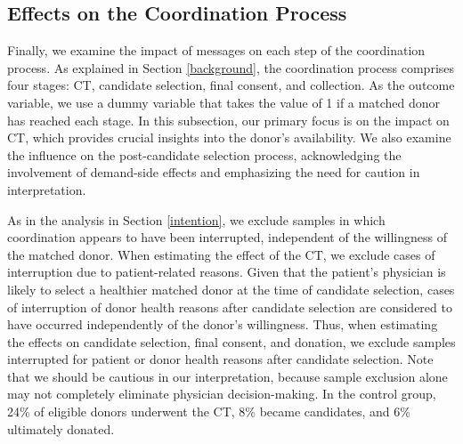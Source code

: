\documentclass[12pt, a4paper]{article}
\begin{document}
\hypertarget{process}{%
\subsection{Effects on the Coordination Process}\label{process}}

Finally, we examine the impact of messages on each step of the coordination process. As explained in Section \ref{background}, the coordination process comprises four stages: CT, candidate selection, final consent, and collection. As the outcome variable, we use a dummy variable that takes the value of 1 if a matched donor has reached each stage. In this subsection, our primary focus is on the impact on CT, which provides crucial insights into the donor's availability. We also examine the influence on the post-candidate selection process, acknowledging the involvement of demand-side effects and emphasizing the need for caution in interpretation.

As in the analysis in Section \ref{intention}, we exclude samples in which coordination appears to have been interrupted, independent of the willingness of the matched donor. When estimating the effect of the CT, we exclude cases of interruption due to patient-related reasons. Given that the patient's physician is likely to select a healthier matched donor at the time of candidate selection, cases of interruption of donor health reasons after candidate selection are considered to have occurred independently of the donor's willingness. Thus, when estimating the effects on candidate selection, final consent, and donation, we exclude samples interrupted for patient or donor health reasons after candidate selection. Note that we should be cautious in our interpretation, because sample exclusion alone may not completely eliminate physician decision-making. In the control group, 24\% of eligible donors underwent the CT, 8\% became candidates, and 6\% ultimately donated.
\end{document}
